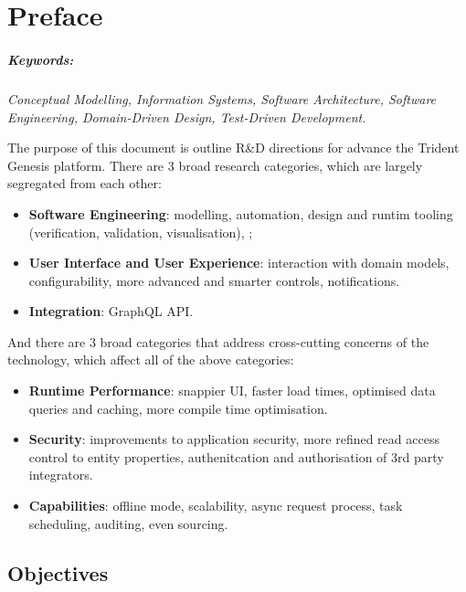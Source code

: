 \chapter{Preface}
\paragraph{Keywords:} \emph{Conceptual Modelling, Information Systems, Software Architecture, Software Engineering, Domain-Driven Design, Test-Driven Development.}
\vspace*{1em}

The purpose of this document is outline R\&D directions for advance the Trident Genesis platform.
There are 3 broad research categories, which are largely segregated from each other:

\begin{itemize}
    \item \textbf{Software Engineering}: modelling, automation, design and runtim tooling (verification, validation, visualisation), ;
    \item \textbf{User Interface and User Experience}: interaction with domain models, configurability, more advanced and smarter controls, notifications.
    \item \textbf{Integration}: GraphQL API.
\end{itemize}

\noindent And there are 3 broad categories that address cross-cutting concerns of the technology, which affect all of the above categories:

\begin{itemize}
    \item \textbf{Runtime Performance}: snappier UI, faster load times, optimised data queries and caching, more compile time optimisation.
    \item \textbf{Security}: improvements to application security, more refined read access control to entity properties, authenitcation and authorisation of 3rd party integrators.
    \item \textbf{Capabilities}: offline mode, scalability, async request process, task scheduling, auditing, even sourcing.
\end{itemize}


\section{Objectives}


